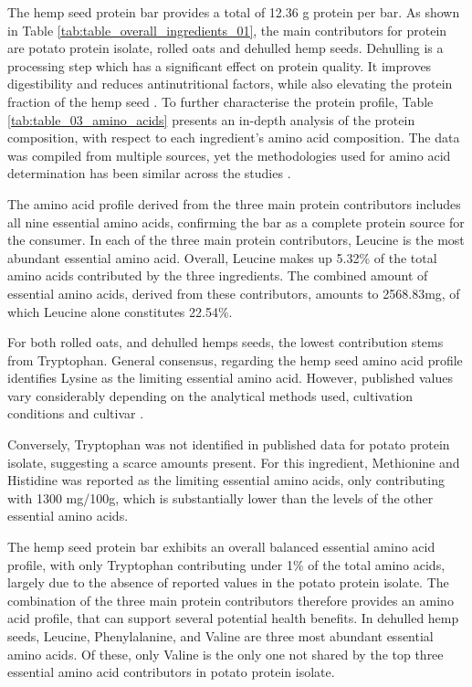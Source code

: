 \vspace{1em}
The hemp seed protein bar provides a total of 12.36 g protein per bar. As shown in Table \ref*{tab:table_overall_ingredients_01}, the main contributors for protein are potato protein isolate, rolled oats and dehulled hemp seeds. Dehulling is a processing step which has a significant effect on protein quality. It improves digestibility and reduces antinutritional factors, while also elevating the protein fraction of the hemp seed \cite*{HempBook}. To further characterise the protein profile, Table \ref*{tab:table_03_amino_acids} presents an in-depth analysis of the protein composition, with respect to each ingredient’s amino acid composition. The data was compiled from multiple sources, yet the methodologies used for amino acid determination has been similar across the studies \cite*{art_08_protein_amino, frida_food, art_09_potato_protein, art_10_hemp_aa}.

\vspace{1em}
The amino acid profile derived from the three main protein contributors includes all nine essential amino acids, confirming the bar as a complete protein source for the consumer. In each of the three main protein contributors, Leucine is the most abundant essential amino acid. Overall, Leucine makes up 5.32\% of the total amino acids contributed by the three ingredients. The combined amount of essential amino acids, derived from these contributors, amounts to 2568.83mg, of which Leucine alone constitutes 22.54\%.

\vspace{1em}
For both rolled oats, and dehulled hemps seeds, the lowest contribution stems from Tryptophan. General consensus, regarding the hemp seed amino acid profile identifies Lysine as the limiting essential amino acid. However, published values vary considerably depending on the analytical methods used, cultivation conditions and cultivar \cite*{HempBook}. 

\vspace{1em}
Conversely, Tryptophan was not identified in published data for potato protein isolate, suggesting a scarce amounts present. For this ingredient, Methionine and Histidine was reported as the limiting essential amino acids, only contributing with 1300 mg/100g, which is substantially lower than the levels of the other essential amino acids. 

\vspace{1em}
The hemp seed protein bar exhibits an overall balanced essential amino acid profile, with only Tryptophan contributing under 1\% of the total amino acids, largely due to the absence of reported values in the potato protein isolate. The combination of the three main protein contributors therefore provides an amino acid profile, that can support several potential health benefits. In dehulled hemp seeds, Leucine, Phenylalanine, and Valine are three most abundant essential amino acids. Of these, only Valine is the only one not shared by the top three essential amino acid contributors in potato protein isolate. 

